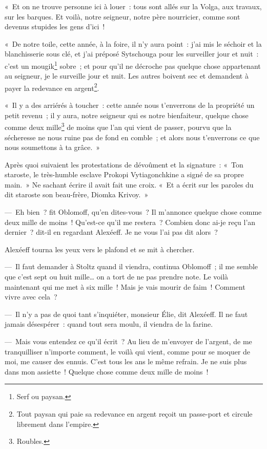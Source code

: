 \documentclass[french,twoside]{book} %
\begin{document}
« Et on ne trouve personne ici à louer : tous sont allés sur la Volga, aux travaux, sur les barques. Et voilà, notre seigneur, notre père nourricier, comme sont devenus stupides les gens d’ici !\par
« De notre toile, cette année, à la foire, il n’y aura point : j’ai mis le séchoir et la blanchisserie sous clé, et j’ai préposé Sytschouga pour les surveiller jour et nuit : c’est un mougik\footnote{Serf ou paysan.} sobre ; et pour qu’il ne décroche pas quelque chose appartenant au seigneur, je le surveille jour et nuit. Les autres boivent sec et demandent à payer la redevance en argent\footnote{Tout paysan qui paie sa redevance en argent reçoit un passe-port et circule librement dans l’empire.}.\par
« Il y a des arriérés à toucher : cette année nous t’enverrons de la propriété un petit revenu ; il y aura, notre seigneur qui es notre bienfaiteur, quelque chose comme deux mille\footnote{Roubles.} de moins que l’an qui vient de passer, pourvu que la sécheresse ne nous ruine pas de fond en comble ; et alors nous t’enverrons ce que nous soumettons à ta grâce. »\par
Après quoi suivaient les protestations de dévoûment et la signature : « Ton staroste, le très-humble esclave Prokopi Vytiagonchkine a signé de sa propre main. » Ne sachant écrire il avait fait une croix. « Et a écrit sur les paroles du dit staroste son beau-frère, Diomka Krivoy. »\par
— Eh bien ? fit Oblomoff, qu’en dites-vous ? Il m’annonce quelque chose comme deux mille de moins ! Qu’est-ce qu’il me restera ? Combien donc ai-je reçu l’an dernier ? dit-il en regardant Alexéeff. Je ne vous l’ai pas dit alors ?\par
Alexéeff tourna les yeux vers le plafond et se mit à chercher.\par
— Il faut demander à Stoltz quand il viendra, continua Oblomoff ; il me semble que c’est sept ou huit mille… on a tort de ne pas prendre note. Le voilà maintenant qui me met à six mille ! Mais je vais mourir de faim ! Comment vivre avec cela ?\par
— Il n’y a pas de quoi tant s’inquiéter, monsieur Élie, dit Alexéeff. Il ne faut jamais désespérer : quand tout sera moulu, il viendra de la farine.\par
— Mais vous entendez ce qu’il écrit ? Au lieu de m’envoyer de l’argent, de me tranquilliser n’importe comment, le voilà qui vient, comme pour se moquer de moi, me causer des ennuis. C’est tous les ans le même refrain. Je ne suis plus dans mon assiette ! Quelque chose comme deux mille de moins !\par
\end{document}
